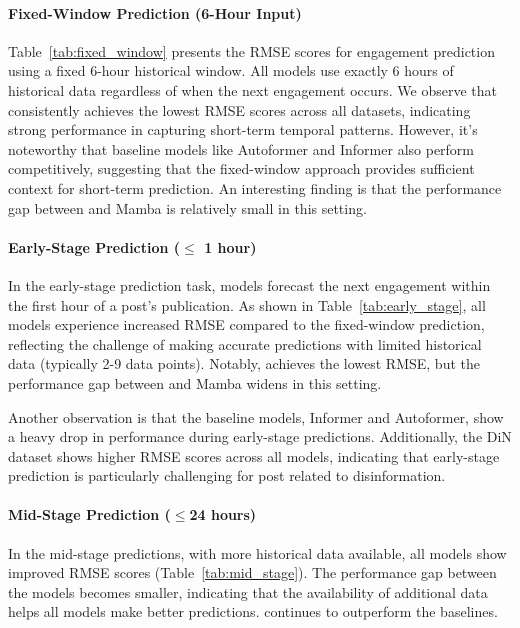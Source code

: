 \paragraph{Fixed-Window Prediction (6-Hour Input)} Table~\ref{tab:fixed_window} presents the RMSE scores for engagement prediction using a fixed 6-hour historical window. All models use exactly 6 hours of historical data regardless of when the next engagement occurs. 
We observe that \icmamba consistently achieves the lowest RMSE scores across all datasets, indicating strong performance in capturing short-term temporal patterns. However, it's noteworthy that baseline models like Autoformer and Informer also perform competitively, suggesting that the fixed-window approach provides sufficient context for short-term prediction.
An interesting finding is that the performance gap between \icmamba and Mamba is relatively small in this setting. 


\paragraph{Early-Stage Prediction ($\leq$ 1 hour)}
In the early-stage prediction task, models forecast the next engagement within the first hour of a post's publication. As shown in Table~\ref{tab:early_stage}, all models experience increased RMSE compared to the fixed-window prediction, reflecting the challenge of making accurate predictions with limited historical data (typically 2-9 data points). Notably, \icmamba achieves the lowest RMSE, but the performance gap between \icmamba and Mamba widens in this setting.

Another observation is that the baseline models, Informer and Autoformer, show a heavy drop in performance during early-stage predictions. 
Additionally, the DiN dataset shows higher RMSE scores across all models, indicating that early-stage prediction is particularly challenging for post related to disinformation. 

\paragraph{Mid-Stage Prediction ($\leq$24 hours)}
In the mid-stage predictions, with more historical data available, all models show improved RMSE scores (Table~\ref{tab:mid_stage}). The performance gap between the models becomes smaller, indicating that the availability of additional data helps all models make better predictions. \icmamba continues to outperform the baselines.

